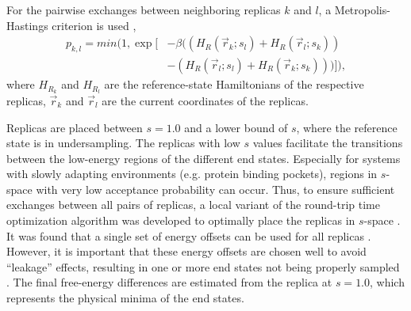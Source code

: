 For the pairwise exchanges between neighboring replicas $k$ and $l$, a Metropolis-Hastings criterion \cite{Hastings1970} is used \cite{Sidler2016,Sugita2000},
\begin{equation}
    \begin{split}
    p_{k,l} = min\bigg(1, \exp \Big[
                &-\beta \big((H_{R}(\vec{r}_k; s_l)+H_{R}(\vec{r}_l; s_k))\\
                &-(H_{R}(\vec{r}_l; s_l)+H_{R}(\vec{r}_k; s_k))\big)  \Big] \bigg) ,
    \end{split}
\end{equation}
where $H_{R_k}$ and $H_{R_l}$ are the reference-state Hamiltonians of the respective replicas, $\vec{r}_k$ and $\vec{r}_l$ are the current coordinates of the replicas.

Replicas are placed between $s=1.0$ and a lower bound of $s$, where the reference state is in undersampling. The replicas with low $s$ values facilitate the transitions between the low-energy regions of the  different end states. Especially for systems with slowly adapting environments (e.g. protein binding pockets), regions in $s$-space with very low acceptance probability can occur. Thus, to ensure sufficient exchanges between all pairs of replicas, a local variant of the round-trip time optimization algorithm \cite{Katzgraber2006, Nadler2008} was developed to optimally place the replicas in $s$-space \cite{Sidler2017}.
It was found that a single set of energy offsets can be used for all replicas \cite{Sidler2016}. However, it is important that these energy offsets are chosen well to avoid ``leakage'' effects, resulting in one or more end states not being properly sampled \cite{Sidler2016}.
The final free-energy differences are estimated from the replica at $s=1.0$, which represents the physical minima of the end states.

